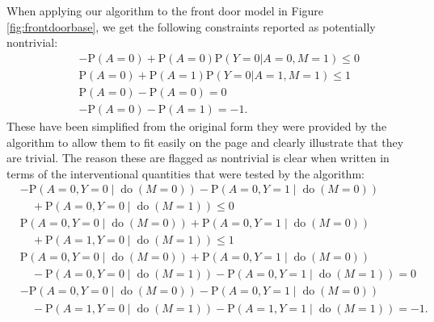 \documentclass[12pt]{article}
\def\Pr{{\mathrm{P}}}
\DeclareMathOperator{\Do}{do}
\begin{document}
When applying our algorithm to the front door model in Figure \ref{fig:frontdoorbase}, we get the following constraints reported as potentially nontrivial: 
\vspace{-0.5 cm}
\begin{eqnarray*}
&& -\Pr(A = 0) + \Pr(A = 0)\Pr(Y = 0|A = 0,M = 1) \leq 0 \\
&& \Pr(A = 0) + \Pr(A = 1)\Pr(Y = 0|A = 1,M = 1) \leq 1 \\  && \Pr(A = 0) - \Pr(A = 0)  =  0 \\
&& -\Pr(A = 0) - \Pr(A = 1) =  -1. 
\end{eqnarray*}
These have been simplified from the original form they were provided by the algorithm to allow them to fit easily on the page and clearly illustrate that they are trivial. The reason these are flagged as nontrivial is clear when written in terms of the interventional quantities that were tested by the algorithm: 
\begin{align*}
&-\Pr(A = 0, Y = 0 \mid \Do(M = 0))
 - \Pr(A = 0, Y = 1 \mid \Do(M = 0)) \\
&\quad
 + \Pr(A = 0, Y = 0 \mid \Do(M = 1))
 \leq 0
\\[0.75ex]
&\Pr(A = 0, Y = 0 \mid \Do(M = 0))
 + \Pr(A = 0, Y = 1 \mid \Do(M = 0)) \\
&\quad
 + \Pr(A = 1, Y = 0 \mid \Do(M = 1))
 \leq 1
\\[0.75ex]
&\Pr(A = 0, Y = 0 \mid \Do(M = 0))
 + \Pr(A = 0, Y = 1 \mid \Do(M = 0)) \\
&\quad
 - \Pr(A = 0, Y = 0 \mid \Do(M = 1))
 - \Pr(A = 0, Y = 1 \mid \Do(M = 1))
 = 0
\\[0.75ex]
&-\Pr(A = 0, Y = 0 \mid \Do(M = 0))
 - \Pr(A = 0, Y = 1 \mid \Do(M = 0)) \\
&\quad
 - \Pr(A = 1, Y = 0 \mid \Do(M = 1))
 - \Pr(A = 1, Y = 1 \mid \Do(M = 1))
 = -1 .
\end{align*}
\end{document}
